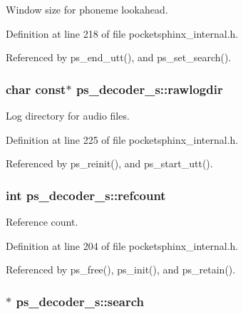 Window size for phoneme lookahead. 



Definition at line 218 of file pocketsphinx\-\_\-internal.\-h.



Referenced by ps\-\_\-end\-\_\-utt(), and ps\-\_\-set\-\_\-search().

\subsubsection[{rawlogdir}]{\setlength{\rightskip}{0pt plus 5cm}char const$\ast$ ps\-\_\-decoder\-\_\-s\-::rawlogdir}\label{structps__decoder__s_aa2610c52a9267ee18ca095169bf34bfd}


Log directory for audio files. 



Definition at line 225 of file pocketsphinx\-\_\-internal.\-h.



Referenced by ps\-\_\-reinit(), and ps\-\_\-start\-\_\-utt().

\subsubsection[{refcount}]{\setlength{\rightskip}{0pt plus 5cm}int ps\-\_\-decoder\-\_\-s\-::refcount}\label{structps__decoder__s_aa5ab90180288b6c9039eb86b496f76aa}


Reference count. 



Definition at line 204 of file pocketsphinx\-\_\-internal.\-h.



Referenced by ps\-\_\-free(), ps\-\_\-init(), and ps\-\_\-retain().

\subsubsection[{search}]{$\ast$ ps\-\_\-decoder\-\_\-s\-::search}\label{structps__decoder__s_ad337270efc93613cf8dd7594f6515799}


